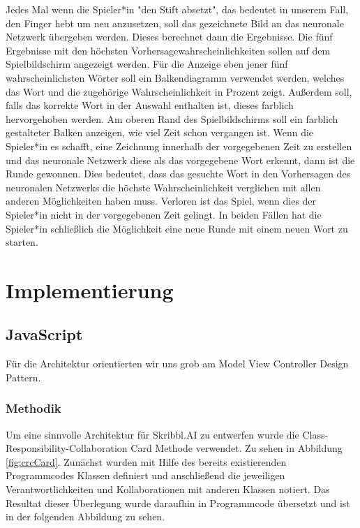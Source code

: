 \documentclass[11pt]{article}
\begin{document}
Jedes Mal wenn die Spieler*in "den Stift absetzt", das bedeutet in unserem Fall, den Finger hebt um neu anzusetzen, soll das gezeichnete Bild an das neuronale Netzwerk übergeben werden. Dieses berechnet dann die Ergebnisse. Die fünf Ergebnisse mit den höchsten Vorhersagewahrscheinlichkeiten sollen auf dem Spielbildschirm angezeigt werden. Für die Anzeige eben jener fünf wahrscheinlichsten Wörter soll ein Balkendiagramm verwendet werden, welches das Wort und die zugehörige Wahrscheinlichkeit in Prozent zeigt. Außerdem soll, falls das korrekte Wort in der Auswahl enthalten ist, dieses farblich hervorgehoben werden. Am oberen Rand des Spielbildschirms soll ein farblich gestalteter Balken anzeigen, wie viel Zeit schon vergangen ist. Wenn die Spieler*in es schafft, eine  Zeichnung innerhalb der vorgegebenen Zeit zu erstellen und das neuronale Netzwerk diese als das vorgegebene Wort erkennt, dann ist die Runde gewonnen. Dies bedeutet, dass das gesuchte Wort in den Vorhersagen des neuronalen Netzwerks die höchste Wahrscheinlichkeit verglichen mit allen anderen Möglichkeiten haben muss. Verloren ist das Spiel, wenn dies der Spieler*in nicht in der vorgegebenen Zeit gelingt. 
In beiden Fällen hat die Spieler*in schließlich die Möglichkeit eine neue Runde mit einem neuen Wort zu starten.

\section{Implementierung}
\subsection{JavaScript}
Für die Architektur orientierten wir uns grob am Model View Controller Design Pattern.
\subsubsection{Methodik}
Um eine sinnvolle Architektur für Skribbl.AI zu entwerfen wurde die Class-Responsibility-Collaboration Card Methode verwendet. Zu sehen in Abbildung \ref{fig:crcCard}. Zunächst wurden mit Hilfe des bereits existierenden Programmcodes Klassen definiert und anschließend die jeweiligen Verantwortlichkeiten und Kollaborationen mit anderen Klassen notiert. Das Resultat dieser Überlegung wurde daraufhin in Programmcode übersetzt und ist in der folgenden Abbildung zu sehen.
\end{document}
